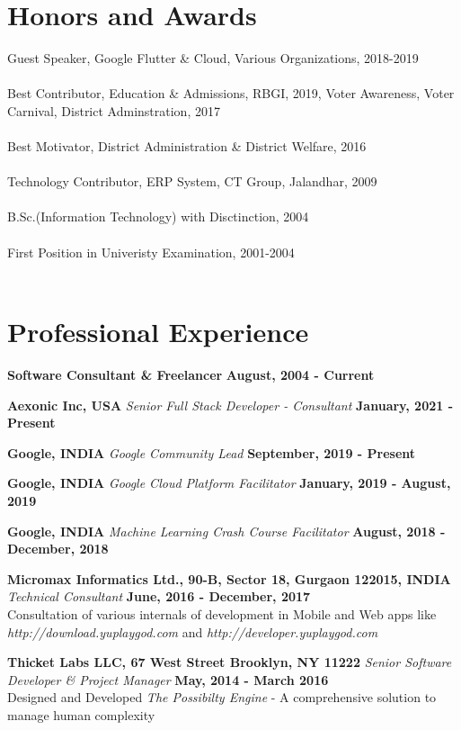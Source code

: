 \documentclass[margin,line]{res}
\begin{document}
\begin{resume}
\section{\sc Honors and Awards}
Guest Speaker, Google Flutter \& Cloud, Various Organizations, 2018-2019\\\\
Best Contributor, Education \& Admissions, RBGI, 2019,
Voter Awareness, Voter Carnival, District Adminstration, 2017\\\\
Best Motivator, District Administration \& District Welfare, 2016\\\\
Technology Contributor, ERP System, CT Group, Jalandhar, 2009\\\\
B.Sc.(Information Technology) with Disctinction, 2004\\\\
First Position in Univeristy Examination, 2001-2004\\\\

\section{\sc Professional Experience}

{\bf Software Consultant \& Freelancer} \hfill {\bf August, 2004 - Current}

{\bf Aexonic Inc, USA}
{\em Senior Full Stack Developer - Consultant} \hfill {\bf January, 2021 - Present}

{\bf Google, INDIA}
{\em Google Community Lead} \hfill {\bf September, 2019 - Present}

{\bf Google, INDIA}
{\em Google Cloud Platform Facilitator} \hfill {\bf January, 2019 - August, 2019}

{\bf Google, INDIA}
{\em Machine Learning Crash Course Facilitator} \hfill {\bf August, 2018 - December, 2018}

{\bf Micromax Informatics Ltd., 90-B, Sector 18, Gurgaon 122015, INDIA}
{\em Technical Consultant} \hfill {\bf June, 2016 - December, 2017}\\
Consultation of various internals of development in Mobile and Web apps like {\em http://download.yuplaygod.com} and {\em http://developer.yuplaygod.com}

{\bf Thicket Labs LLC, 67 West Street Brooklyn, NY 11222}
{\em Senior Software Developer \& Project Manager} \hfill {\bf May, 2014 - March 2016}\\
Designed and Developed {\em The Possibilty Engine} - A comprehensive solution to manage human complexity


\end{resume}
\end{document}
